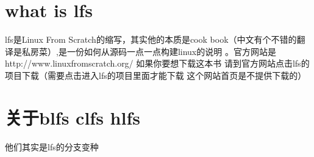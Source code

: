 \section{what is lfs}
lfs是Linux From Scratch的缩写，其实他的本质是cook book（中文有个不错的翻译是私房菜）,是一份如何从源码一点一点构建linux的说明
。官方网站是http://www.linuxfromscratch.org/ 如果你要想下载这本书 请到官方网站点击lfs的项目下载（需要点击进入lfs的项目里面才能下载 这个网站首页是不提供下载的）
\section{关于blfs clfs hlfs}
他们其实是lfs的分支变种